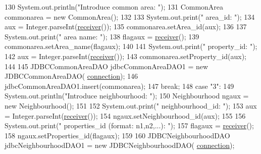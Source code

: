 \begin{DoxyCode}
130                         System.out.println(\textcolor{stringliteral}{"Introduce common area: "});
131                         CommonArea commonarea = \textcolor{keyword}{new} CommonArea();
132                         
133                         System.out.print(\textcolor{stringliteral}{"    area\_id: "});
134                         aux =  Integer.parseInt(\mbox{\hyperlink{classcms_1_1_c_m_s_ad13be0e97a0bb295dcedd134942a79b4}{receiver}}());
135                         commonarea.setArea\_id(aux);
136                         
137                         System.out.print(\textcolor{stringliteral}{"    area name: "});
138                         flagaux = \mbox{\hyperlink{classcms_1_1_c_m_s_ad13be0e97a0bb295dcedd134942a79b4}{receiver}}();
139                         commonarea.setArea\_name(flagaux);
140                         
141                         System.out.print(\textcolor{stringliteral}{"    property\_id: "});
142                         aux =  Integer.parseInt(\mbox{\hyperlink{classcms_1_1_c_m_s_ad13be0e97a0bb295dcedd134942a79b4}{receiver}}());
143                         commonarea.setProperty\_id(aux);
144                         
145                         JDBCCommonAreaDAO jdbcCommonAreaDAO1 = \textcolor{keyword}{new} JDBCCommonAreaDAO(
      \mbox{\hyperlink{classcms_1_1_c_m_s_afc28cfd2c4356509b85775219b7b1e05}{connection}});
146                         jdbcCommonAreaDAO1.insert(commonarea);
147                     \textcolor{keywordflow}{break};
148                     \textcolor{keywordflow}{case} \textcolor{stringliteral}{"3"}:
149                         System.out.println(\textcolor{stringliteral}{"Introduce neighbourhood: "});
150                         Neighbourhood ngaux = \textcolor{keyword}{new} Neighbourhood();
151                         
152                         System.out.print(\textcolor{stringliteral}{"    neighbourhood\_id: "});
153                         aux =  Integer.parseInt(\mbox{\hyperlink{classcms_1_1_c_m_s_ad13be0e97a0bb295dcedd134942a79b4}{receiver}}());
154                         ngaux.setNeighbourhood\_id(aux);
155                         
156                         System.out.print(\textcolor{stringliteral}{"    properties\_id (format: n1,n2,...): "});
157                         flagaux = \mbox{\hyperlink{classcms_1_1_c_m_s_ad13be0e97a0bb295dcedd134942a79b4}{receiver}}();
158                         ngaux.setProperties\_id(flagaux);
159                         
160                         JDBCNeighbourhoodDAO jdbcNeighbourhoodDAO1 = \textcolor{keyword}{new} JDBCNeighbourhoodDAO(
      \mbox{\hyperlink{classcms_1_1_c_m_s_afc28cfd2c4356509b85775219b7b1e05}{connection}});

\end{DoxyCode}
